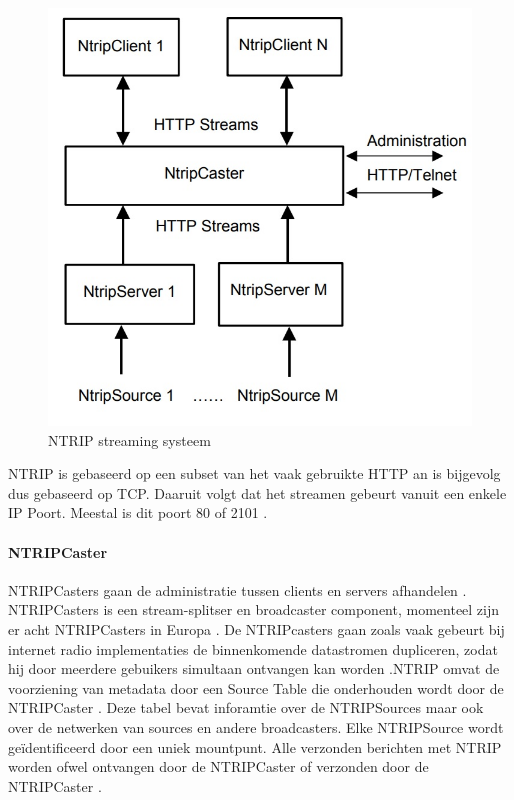 \begin{figure}[hpb]
	\includegraphics[scale=0.65]{NTRIP.jpg}
	\caption{NTRIP streaming systeem \cite{LBibNTRIP}}
	\label{imgNTRIP}
\end{figure} 
NTRIP is gebaseerd op een subset van het  vaak gebruikte HTTP an is bijgevolg dus gebaseerd op TCP. Daaruit volgt dat het streamen gebeurt vanuit een enkele IP Poort. Meestal is dit poort 80 of 2101 \cite{LBibNTRIP3}. 

\paragraph{NTRIPCaster}
 NTRIPCasters gaan de administratie tussen clients en servers afhandelen \cite{LBibGPS}. NTRIPCasters is een stream-splitser en broadcaster component, momenteel zijn er acht NTRIPCasters in Europa \cite{LBibNTRIP}. De NTRIPcasters gaan zoals vaak gebeurt bij internet radio implementaties de binnenkomende datastromen dupliceren, zodat hij door meerdere gebuikers simultaan ontvangen kan worden \cite{LBibNTRIP2}.NTRIP omvat de voorziening van metadata door een Source Table die onderhouden wordt door de NTRIPCaster \cite{LBibNTRIP3}. Deze tabel bevat inforamtie over de NTRIPSources maar ook over de netwerken van sources en andere broadcasters. Elke NTRIPSource wordt ge\"identificeerd door een uniek mountpunt. Alle verzonden berichten met NTRIP worden ofwel ontvangen door de NTRIPCaster of verzonden door de NTRIPCaster \cite{LBibNTRIP4}.
 

